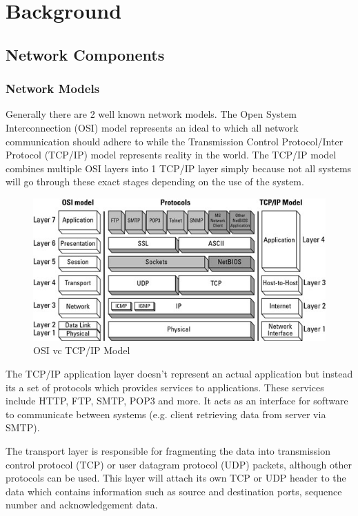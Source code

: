 \documentclass[final_report.tex]{subfiles}
\begin{document}
\section{Background}

\subsection{Network Components}

\subsubsection{Network Models}
Generally there are 2 well known network models. The Open System Interconnection (OSI) model represents an ideal to which all network communication should adhere to while the Transmission Control Protocol/Inter Protocol (TCP/IP) model represents reality in the world. The TCP/IP model combines multiple OSI layers into 1 TCP/IP layer simply because not all systems will go through these exact stages depending on the use of the system.

\begin{figure}[H]
	\centering
	\includegraphics[width=\textwidth]{img/layers.jpg}
	\caption{OSI vc TCP/IP Model}
	\label{fig:layers}
\end{figure}

The TCP/IP application layer doesn't represent an actual application but instead its a set of protocols which provides services to applications. These services include HTTP, FTP, SMTP, POP3 and more. It acts as an interface for software to communicate between systems (e.g. client retrieving data from server via SMTP).

The transport layer is responsible for fragmenting the data into transmission control protocol (TCP) or user datagram protocol (UDP) packets, although other protocols can be used. This layer will attach its own TCP or UDP header to the data which contains information such as source and destination ports, sequence number and acknowledgement data.
\end{document}
